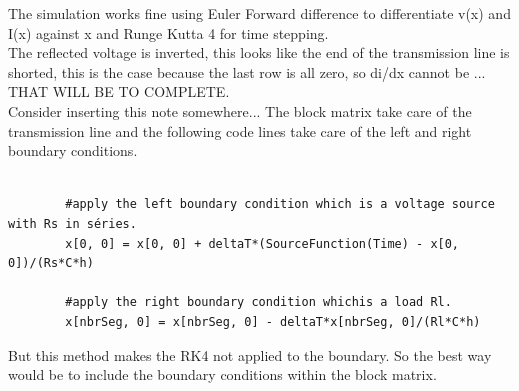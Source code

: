 \documentclass[12pt, letterpaper]{article}
\begin{document}
The simulation works fine using Euler Forward difference to differentiate v(x) and I(x) against x and Runge Kutta 4 for time stepping.\\

The reflected voltage is inverted, this looks like the end of the transmission line is shorted, this is the case because the last row is all zero, so di/dx cannot be ... THAT WILL BE TO COMPLETE.\\


	
	
Consider inserting this note somewhere...
	The block matrix take care of the transmission line and the following code lines take care of the left and right boundary conditions.
	
	\begin{verbatim}
		
		#apply the left boundary condition which is a voltage source with Rs in séries.
		x[0, 0] = x[0, 0] + deltaT*(SourceFunction(Time) - x[0, 0])/(Rs*C*h)
		
		#apply the right boundary condition whichis a load Rl.
		x[nbrSeg, 0] = x[nbrSeg, 0] - deltaT*x[nbrSeg, 0]/(Rl*C*h)
	\end{verbatim}
	
	But this method makes the RK4 not applied to the boundary. So the best way would be to include the boundary conditions within the block matrix.\\
\end{document}
